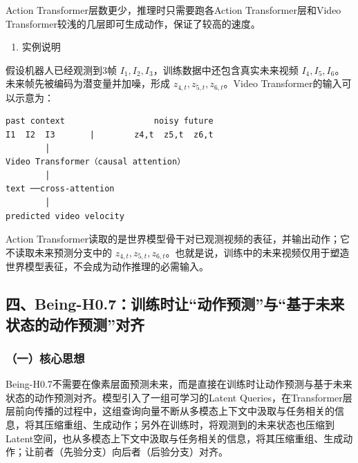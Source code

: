 Action Transformer层数更少，推理时只需要跑各Action Transformer层和Video Transformer较浅的几层即可生成动作，保证了较高的速度。

\begin{enumerate}
\def\labelenumi{\arabic{enumi}.}
\setcounter{enumi}{2}
\tightlist
\item
  实例说明
\end{enumerate}

假设机器人已经观测到3帧 \(I_1,I_2,I_3\)，训练数据中还包含真实未来视频 \(I_4,I_5,I_6\)。未来帧先被编码为潜变量并加噪，形成 \(z_{4,t},z_{5,t},z_{6,t}\)。Video Transformer的输入可以示意为：

\begin{verbatim}
past context                  noisy future
I1  I2  I3       |        z4,t  z5,t  z6,t
        │
Video Transformer（causal attention）
        │
text ──cross-attention
        │
predicted video velocity
\end{verbatim}

Action Transformer读取的是世界模型骨干对已观测视频的表征，并输出动作；它不读取未来预测分支中的 \(z_{4,t},z_{5,t},z_{6,t}\)。也就是说，训练中的未来视频仅用于塑造世界模型表征，不会成为动作推理的必需输入。

\hypertarget{ux56dbbeing-h0.7ux8badux7ec3ux65f6ux8ba9ux52a8ux4f5cux9884ux6d4bux4e0eux57faux4e8eux672aux6765ux72b6ux6001ux7684ux52a8ux4f5cux9884ux6d4bux5bf9ux9f50}{%
\subsection{四、Being-H0.7：训练时让``动作预测''与``基于未来状态的动作预测''对齐}\label{ux56dbbeing-h0.7ux8badux7ec3ux65f6ux8ba9ux52a8ux4f5cux9884ux6d4bux4e0eux57faux4e8eux672aux6765ux72b6ux6001ux7684ux52a8ux4f5cux9884ux6d4bux5bf9ux9f50}}

\hypertarget{ux4e00ux6838ux5fc3ux601dux60f3-20}{%
\subsubsection{（一）核心思想}\label{ux4e00ux6838ux5fc3ux601dux60f3-20}}

Being-H0.7不需要在像素层面预测未来，而是直接在训练时让动作预测与基于未来状态的动作预测对齐。模型引入了一组可学习的Latent Queries，在Transformer层层前向传播的过程中，这组查询向量不断从多模态上下文中汲取与任务相关的信息，将其压缩重组、生成动作；另外在训练时，将观测到的未来状态也压缩到Latent空间，也从多模态上下文中汲取与任务相关的信息，将其压缩重组、生成动作；让前者（先验分支）向后者（后验分支）对齐。


